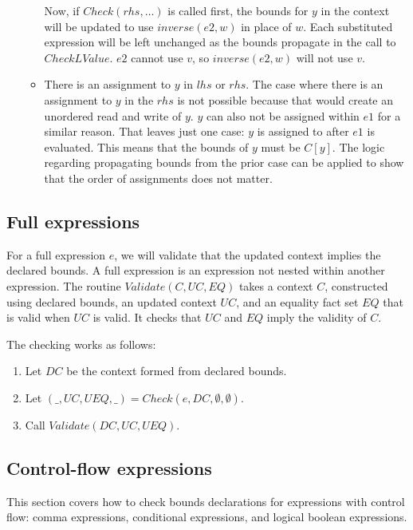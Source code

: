 \begin{itemize}
\begin{itemize}
Now, if $Check(rhs, \ldots)$ is called first, the bounds for $y$ in the context will be updated to use
$inverse(e2, w)$ in place of $w$.  Each substituted expression will be left unchanged as the bounds
propagate in the call to $CheckLValue$.  $e2$ cannot use $v$, so $inverse(e2, w)$ will not use $v$.

\item There is an assignment to $y$ in $lhs$ or $rhs$.   The case where there is an assignment 
to $y$ in the $rhs$ is not possible because that would create an unordered read and write of $y$.
$y$ can also not be assigned within $e1$ for a similar reason.  That leaves just one case: $y$ is
assigned to after $e1$ is evaluated.  This means that the bounds of $y$ must be $C[y]$.   The logic
regarding propagating bounds from the prior case can be applied to show that the order of
assignments does not matter.
\end{itemize}
\end{itemize}

\subsection{Full expressions}

For a full expression $e$, we will validate that the updated context implies the declared bounds.
A full expression \cite[Annex C]{ISO2011} is an expression not nested within another expression.
The routine $Validate(C, UC, EQ)$ takes a context $C$,
constructed using declared bounds, an updated context $UC$, and an equality fact set $EQ$
that is valid when $UC$ is valid.  It checks that $UC$ and $EQ$ imply the validity of $C$.

The checking works as follows:
\begin{enumerate}
\item Let $DC$ be the context formed from declared bounds.
\item Let $(\_, UC, UEQ, \_) = Check(e, DC, \emptyset, \emptyset)$.
\item Call $Validate(DC, UC, UEQ)$.
\end{enumerate}

\subsection{Control-flow expressions}

This section covers how to check bounds declarations for expressions
with control flow: comma expressions, conditional expressions, and 
logical boolean expressions.


